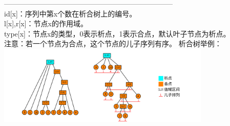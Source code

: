 ﻿-----------------------------------------------------------------------\\
id[x]：序列中第x个数在析合树上的编号。\\
l[x],r[x]：节点x的作用域。\\
type[x]：节点x的类型，0表示析点，1表示合点，默认叶子节点为析点。\\
注意：若一个节点为合点，这个节点的儿子序列有序。
析合树举例：\\
\includegraphics[width=4in]{div-com1.png}

